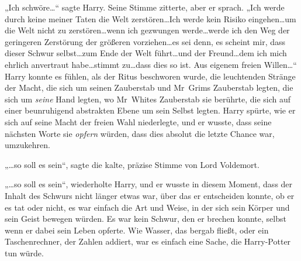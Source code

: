 „Ich schwöre…“ sagte Harry.
Seine Stimme zitterte, aber er sprach.
„Ich werde durch keine meiner Taten die Welt zerstören…Ich werde kein Risiko eingehen…um die Welt nicht zu zerstören…wenn ich gezwungen werde…werde ich den Weg der geringeren Zerstörung der größeren vorziehen…es sei denn, es scheint mir, dass dieser Schwur selbst…zum Ende der Welt führt…und der Freund…dem ich mich ehrlich anvertraut habe…stimmt zu…dass dies so ist. Aus eigenem freien Willen…“
Harry konnte es fühlen, als der Ritus beschworen wurde, die leuchtenden Stränge der Macht, die sich um seinen Zauberstab und Mr~Grims Zauberstab legten, die sich um \emph{seine} Hand legten, wo Mr~Whites Zauberstab sie berührte, die sich auf einer beunruhigend abstrakten Ebene um sein Selbst legten. Harry spürte, wie er sich auf seine Macht der freien Wahl niederlegte, und er wusste, dass seine nächsten Worte sie \emph{opfern} würden, dass dies absolut die letzte Chance war, umzukehren.

„…so soll es sein“, sagte die kalte, präzise Stimme von Lord Voldemort.

„…so soll es sein“, wiederholte Harry, und er wusste in diesem Moment, dass der Inhalt des Schwurs nicht länger etwas war, über das er entscheiden konnte, ob er es tat oder nicht, es war einfach die Art und Weise, in der sich sein Körper und sein Geist bewegen würden. Es war kein Schwur, den er brechen konnte, selbst wenn er dabei sein Leben opferte. Wie Wasser, das bergab fließt, oder ein Taschenrechner, der Zahlen addiert, war es einfach eine Sache, die Harry-Potter tun würde.


